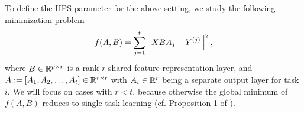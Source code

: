 

	To define the HPS parameter for the above setting, we study the following minimization problem %
	\begin{align}
		f(A, B) = \sum_{j=1}^t \bignorm{X B A_j - Y^{(j)}}^2, \label{eq_mtl_same_cov}
	\end{align}
	where $B \in \mathbb{R}^{p \times r}$ is a rank-$r$ shared feature representation layer, and $A := [A_1, A_2, \dots, A_t] \in \mathbb{R}^{r \times t}$ with $A_i \in \mathbb{R}^r$ being a separate output layer for task $i$. %
We will focus on cases with $r < t$, because otherwise the global minimum of $f(A, B)$ reduces to single-task learning (cf. Proposition 1 of \cite{WZR20}).


